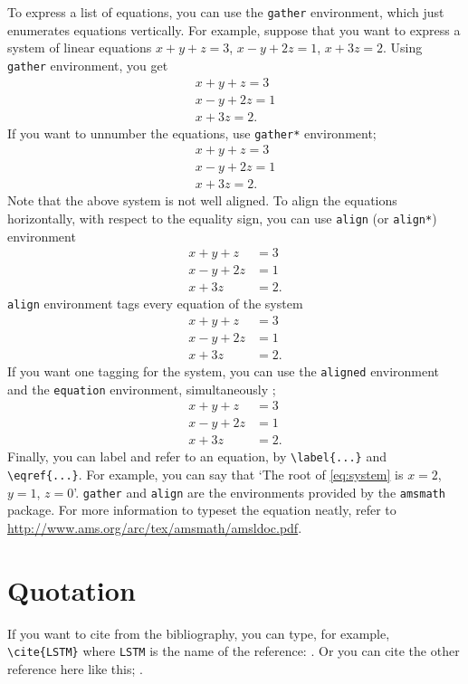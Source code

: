 \documentclass{report}
\begin{document}
To express a list of equations, you can use the \texttt{gather} environment, which just enumerates equations vertically.
For example, suppose that you want to express a system of linear equations \(x+y+z=3\), \(x-y+2z=1\), \(x+3z=2\).
Using \texttt{gather} environment, you get
\begin{gather}
x+y+z=3\\
x-y+2z=1\\
x+3z=2.
\end{gather}
If you want to unnumber the equations, use \texttt{gather*} environment;
\begin{gather*}
x+y+z=3\\
x-y+2z=1\\
x+3z=2.
\end{gather*}
Note that the above system is not well aligned.
To align the equations horizontally, with respect to the equality sign, you can use \texttt{align} (or \texttt{align*}) environment
\begin{align*}
x+y+z&=3\\
x-y+2z&=1\\
x+3z&=2.
\end{align*}
\texttt{align} environment tags every equation of the system
\begin{align}
x+y+z&=3\\
x-y+2z&=1\\
x+3z&=2.
\end{align}
If you want one tagging for the system, you can use the \texttt{aligned} environment and the \texttt{equation} environment, simultaneously ;
\begin{equation}\label{eq:system}
\begin{aligned}
x+y+z&=3\\
x-y+2z&=1\\
x+3z&=2.
\end{aligned}
\end{equation}
Finally, you can label and refer to an equation, by \verb|\label{...}| and \verb|\eqref{...}|.
For example, you can say that `The root of \eqref{eq:system} is \(x=2\), \(y=1\), \(z=0\)'.
\texttt{gather} and \texttt{align} are the environments provided by the \texttt{amsmath} package.
For more information to typeset the equation neatly, refer to \url{http://www.ams.org/arc/tex/amsmath/amsldoc.pdf}.

\section{Quotation}
If you want to cite from the bibliography, you can type, for example, \verb|\cite{LSTM}| where \texttt{LSTM} is the name of the reference: \cite{LSTM}.
Or you can cite the other reference here like this; \cite{pure}.
\end{document}
